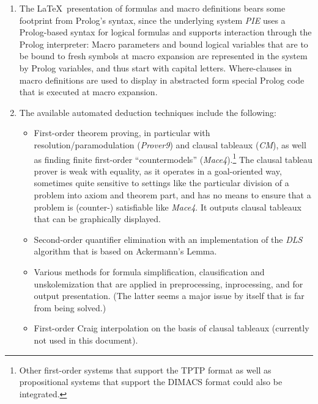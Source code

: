 \documentclass[a4paper]{article}
\newcounter{def}
\newcommand{\name}[1]{\textit{#1}}
\begin{document}
\begin{enumerate}
  \item The \LaTeX\ presentation of formulas and macro definitions bears some
  footprint from Prolog's syntax, since the underlying system \name{PIE} uses
  a Prolog-based syntax for logical formulas and supports interaction through
  the Prolog interpreter: Macro parameters and bound logical variables that
  are to be bound to fresh symbols at macro expansion are represented in the
  system by Prolog variables, and thus start with capital letters.
  Where-clauses in macro definitions are used to display in abstracted form
  special Prolog code that is executed at macro expansion.

  \item The available automated deduction techniques include the following:

  \begin{itemize}

  \item First-order theorem proving, in particular with
  resolution/paramodulation (\name{Prover9}) and clausal tableaux (\name{CM}),
  as well as finding finite first-order ``countermodels''
  (\name{Mace4}).\footnote{Other first-order systems that support the TPTP
  format as well as propositional systems that support the DIMACS format could
  also be integrated.} The clausal tableau prover is weak with equality, as it
  operates in a goal-oriented way, sometimes quite sensitive to settings like
  the particular division of a problem into axiom and theorem part, and has no
  means to ensure that a problem is (counter-) satisfiable like \name{Mace4}.
  It outputs clausal tableaux that can be graphically displayed.

  \item Second-order quantifier elimination with an implementation of the
  \name{DLS} algorithm \cite{dls} that is based on Ackermann's Lemma.

  \item Various methods for formula simplification, clausification and
  unskolemization that are applied in preprocessing, inprocessing, and for
  output presentation. (The latter seems a major issue by itself that is far
  from being solved.)

  \item First-order Craig interpolation on the basis of clausal tableaux
  (currently not used in this document).

  \end{itemize}
  
  \end{enumerate}
\end{document}

